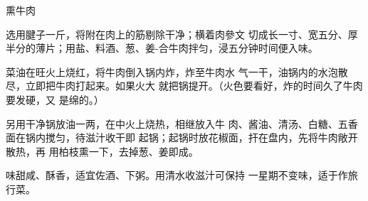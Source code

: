 \begin{recipe}{熏牛肉}

\ingredients



\cooking

\step 选用腱子一斤，将附在肉上的筋剔除干净；横着肉參文 切成长一寸、宽五分、厚半分的薄片；用盐、料酒、葱、姜-合牛肉拌匀，浸五分钟时间便入味。

\step 菜油在旺火上烧红，将牛肉倒入锅内炸，炸至牛肉水 气一干，油锅内的水泡散尽，立即把牛肉打起来。如果火大 就把锅提开。（火色要看好，炸的时间久了牛肉要发硬，又 是绵的。）

\step 另用干净锅放油一两，在中火上烧热，相继放入牛 肉、酱油、清汤、白糖、五香面在锅内搅匀，待滋汁收干即 起锅；起锅时放花椒面，扞在盘内，先将牛肉敞开散热，再 用柏枝熏一下，去掉葱、姜即成。

\notes

味甜咸、酥香，适宜佐酒、下粥。用清水收滋汁可保持 一星期不变味，适于作旅行菜。

\end{recipe}

